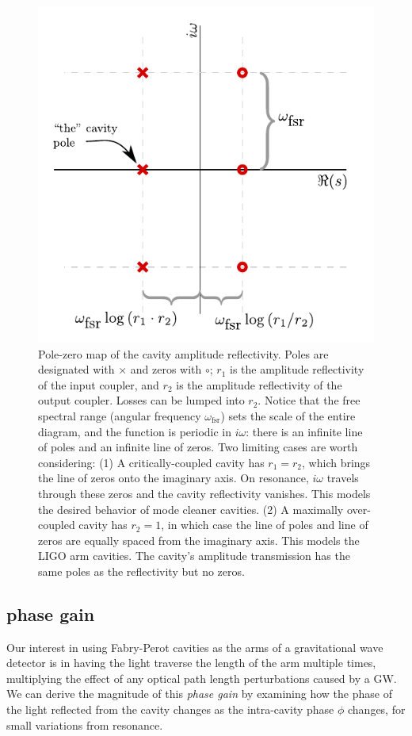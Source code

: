 \begin{figure}
\centering\includegraphics{figures/cavitypzmap.pdf}
\caption[Pole-zero map of Fabry-Perot cavity reflectivity]{\label{fig:cavpzmap} Pole-zero map of the cavity amplitude
  reflectivity.
  Poles are designated with $\times$ and zeros with
  $\circ$; $r_1$ is the amplitude reflectivity of the input coupler,
  and $r_2$ is the amplitude reflectivity of the output coupler.
  Losses can be lumped into $r_2$.  Notice that the free spectral
  range (angular frequency $\omega_{\textrm{fsr}}$) sets the scale of
  the entire diagram, and the function is periodic in $i\omega$: there
  is an infinite line of poles and an infinite line of zeros.  Two
  limiting cases are worth considering: (1) A critically-coupled
  cavity has $r_1=r_2$, which brings the line of zeros onto the
  imaginary axis. On resonance, $i\omega$ travels through these zeros
  and the cavity reflectivity vanishes.  This models the desired
  behavior of mode cleaner cavities. (2) A maximally over-coupled
  cavity has $r_2=1$, in which case the line of poles and line of
  zeros are equally spaced from the imaginary axis.  This models the
  LIGO arm cavities.  
  The cavity's amplitude transmission has the same poles as the
  reflectivity but no zeros.
}
\end{figure}

\subsection{phase gain}
Our interest in using Fabry-Perot cavities as the arms of a
gravitational wave detector is in having the light traverse the length
of the arm multiple times, multiplying the effect of any optical path
length perturbations caused by a GW.  We can derive the magnitude of
this \emph{phase gain} by examining how the phase of the light reflected from
the cavity changes as the intra-cavity phase $\phi$ changes, for small
variations from resonance.

